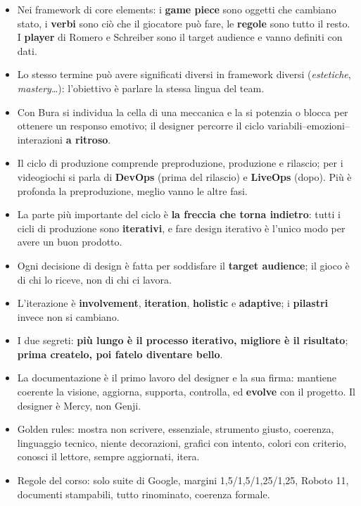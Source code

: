 \begin{itemize}
  \item Nei framework di core elements: i \textbf{game piece} sono oggetti che
        cambiano stato, i \textbf{verbi} sono ciò che il giocatore può fare,
        le \textbf{regole} sono tutto il resto. I \textbf{player} di Romero e
        Schreiber sono il target audience e vanno definiti con dati.
  \item Lo stesso termine può avere significati diversi in framework diversi
        (\emph{estetiche}, \emph{mastery}\dots): l'obiettivo è parlare la
        stessa lingua del team.
  \item Con Bura si individua la cella di una meccanica e la si potenzia o
        blocca per ottenere un responso emotivo; il designer percorre il ciclo
        variabili--emozioni--interazioni \textbf{a ritroso}.
  \item Il ciclo di produzione comprende preproduzione, produzione e rilascio;
        per i videogiochi si parla di \textbf{DevOps} (prima del rilascio) e
        \textbf{LiveOps} (dopo). Più è profonda la preproduzione, meglio
        vanno le altre fasi.
  \item La parte più importante del ciclo è \textbf{la freccia che torna
        indietro}: tutti i cicli di produzione sono \textbf{iterativi}, e
        fare design iterativo è l'unico modo per avere un buon prodotto.
  \item Ogni decisione di design è fatta per soddisfare il \textbf{target
        audience}; il gioco è di chi lo riceve, non di chi ci lavora.
  \item L'iterazione è \textbf{involvement}, \textbf{iteration},
        \textbf{holistic} e \textbf{adaptive}; i \textbf{pilastri} invece non
        si cambiano.
  \item I due segreti: \textbf{più lungo è il processo iterativo, migliore è il
        risultato}; \textbf{prima createlo, poi fatelo diventare bello}.
  \item La documentazione è il primo lavoro del designer e la sua firma:
        mantiene coerente la visione, aggiorna, supporta, controlla, ed
        \textbf{evolve} con il progetto. Il designer è Mercy, non Genji.
  \item Golden rules: mostra non scrivere, essenziale, strumento giusto,
        coerenza, linguaggio tecnico, niente decorazioni, grafici con intento,
        colori con criterio, conosci il lettore, sempre aggiornati, itera.
  \item Regole del corso: solo suite di Google, margini 1,5/1,5/1,25/1,25,
        Roboto 11, documenti stampabili, tutto rinominato, coerenza formale.
\end{itemize}
